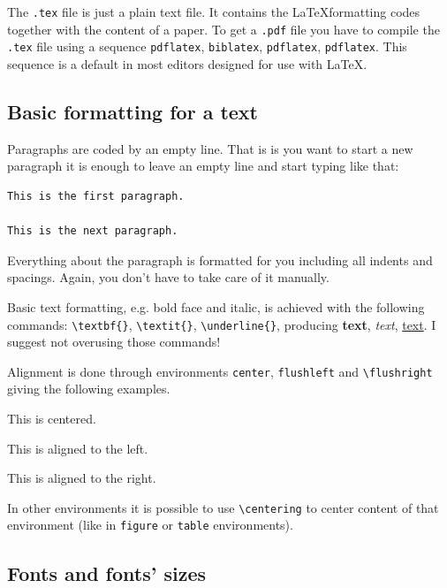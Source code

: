 \documentclass[english, twoside, 12pt, a4paper]{article}
\theoremstyle{definition}
\theoremstyle{plain}
\theoremstyle{remark}
\begin{document}
The \verb+.tex+ file is just a plain text file. It contains the \LaTeX formatting codes together with the content of a paper. To get a \verb+.pdf+ file you have to compile the \verb+.tex+ file using a sequence \verb+pdflatex+, \verb+biblatex+, \verb+pdflatex+, \verb+pdflatex+. This sequence is a default in most editors designed for use with \LaTeX.

\subsection{Basic formatting for a text}

Paragraphs are coded by an empty line. That is is you want to start a new paragraph it is enough to leave an empty line and start typing like that:
\begin{verbatim}
This is the first paragraph.

This is the next paragraph.
\end{verbatim}

Everything about the paragraph is formatted for you including all indents and spacings. Again, you don't have to take care of it manually.

Basic text formatting, e.g. bold face and italic, is achieved with the following commands: \verb+\textbf{}+, \verb+\textit{}+, \verb+\underline{}+, producing \textbf{text}, \textit{text}, \underline{text}. I suggest not overusing those commands!

Alignment is done through environments \verb+center+, \verb+flushleft+ and \verb+\flushright+ giving the following examples.

\begin{center}
  This is centered.
\end{center}

\begin{flushleft}
  This is aligned to the left.
\end{flushleft}

\begin{flushright}
  This is aligned to the right. 
\end{flushright}

In other environments it is possible to use \verb+\centering+ to center content of that environment (like in \verb+figure+ or \verb+table+ environments).

\subsection{Fonts and fonts' sizes}
\end{document}
